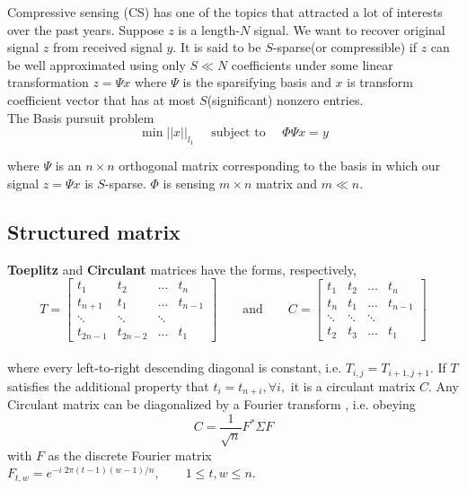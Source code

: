 
Compressive sensing (CS) has one of the topics that attracted a lot of interests over the past years. Suppose $z$ is a length-$N$ signal. We want to recover original signal $z$ from received signal $y$. It is said to be $S$-sparse(or compressible) if $z$ can be well approximated using only $S \ll N$ coefficients under some linear transformation
$ z=\Psi x $
where $\Psi$ is the sparsifying basis and $x$ is transform coefficient vector that has at most $S$(significant) nonzero entries.
\\

The Basis pursuit problem 
\begin{equation}
\min ||x||_{l_1} \quad \text{ subject to } \quad \Phi \Psi x=y
\end{equation}


where $\Psi$ is an $n \times n$ orthogonal matrix corresponding to the basis in which our signal $z = \Psi x$ is $S$-sparse. $\Phi$ is sensing $m \times n$ matrix and $m\ll n$. 
\subsection*{Structured matrix}
\textbf{Toeplitz} and \textbf{Circulant} matrices have the forms, respectively,
\\

$$
T = \begin{bmatrix}
t_{1}    & t_{2}    & ...    & t_{n}   \\[0.3em]
t_{n+1}  & t_{1}    & ...    & t_{n-1} \\[0.3em]
\ddots   & \ddots   & \ddots &         \\[0.3em]
t_{2n-1} & t_{2n-2} & ...    & t_{1}         
\end{bmatrix}
\qquad \text{and} \qquad
C = \begin{bmatrix}
t_{1}  & t_{2}  & ...    & t_{n}   \\[0.3em]
t_{n}  & t_{1}  & ...    & t_{n-1} \\[0.3em]
\ddots & \ddots & \ddots &         \\[0.3em]
t_{2}  & t_{3}  & ...    & t_{1}        
\end{bmatrix} 
$$
\\
where every left-to-right descending diagonal is constant, i.e. $T_{i,j}=T_{i+1,j+1}.$ If $T$ satisfies the additional property that $t_{i}=t_{n+i}, \forall i,$ it is a circulant matrix $C$.
	Any Circulant matrix can be diagonalized by a Fourier transform \cite{wotao} , i.e. obeying
	$$ C=\frac{1}{\sqrt{n}} F^* \Sigma F $$ with $F$ as the discrete Fourier matrix
	$F_{t,w}=e^{-i\; 2\pi(t-1)(w-1)/n}, \qquad 1 \le t,w \le n$.
	

